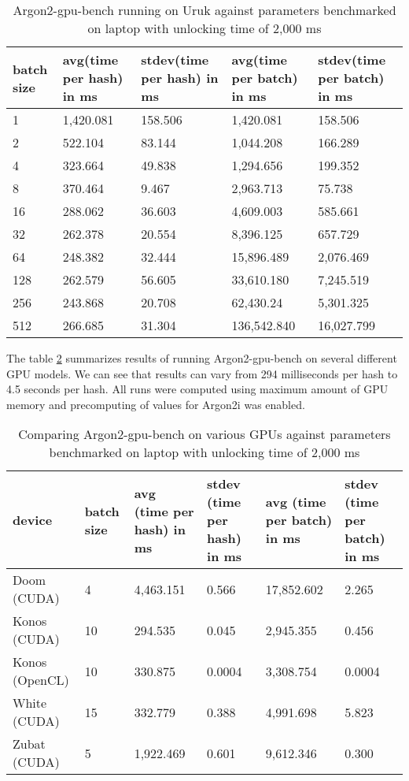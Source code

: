 \documentclass[nolof,digital]{fithesis3}
\begin{document}
\noindent
\begin{table}
\caption{Argon2-gpu-bench running on Uruk against parameters benchmarked on laptop with unlocking time of 2,000 ms}
\label{tab:uruk}
\begin{tabularx}{\textwidth}{| X | X | X | X | X |}
\hline
batch size & avg(time per hash) in ms & stdev(time per hash) in ms & avg(time per batch) in ms & stdev(time per batch) in ms\\
\hline
1 & 1,420.081 & 158.506 & 1,420.081 & 158.506\\
\hline
2 & 522.104 & 83.144 & 1,044.208 & 166.289\\
\hline
4 & 323.664 & 49.838 & 1,294.656 & 199.352\\
\hline
8 & 370.464 & 9.467 & 2,963.713 & 75.738\\
\hline
16 & 288.062 & 36.603 & 4,609.003 & 585.661\\
\hline
32 & 262.378 & 20.554 & 8,396.125 & 657.729\\
\hline
64 & 248.382 & 32.444 & 15,896.489 & 2,076.469\\
\hline
128 & 262.579 & 56.605 & 33,610.180 & 7,245.519\\
\hline
256 & 243.868 & 20.708 & 62,430.24 & 5,301.325\\
\hline
512 & 266.685 & 31.304 & 136,542.840 & 16,027.799\\
\hline
\end{tabularx}
\end{table}

The table \ref{tab:gpus} summarizes results of running Argon2-gpu-bench on several different GPU models. We can see that results can vary from 294 milliseconds per hash to 4.5 seconds per hash. All runs were computed using maximum amount of GPU memory and precomputing of values for Argon2i was enabled.

\noindent
\begin{table}
\caption{Comparing Argon2-gpu-bench on various GPUs against parameters benchmarked on laptop with unlocking time of 2,000 ms}
\label{tab:gpus}
\begin{tabularx}{\textwidth}{| X | X | X | X | X | X |}
\hline
device & batch size & avg (time per hash) in ms & stdev (time per hash) in ms & avg (time per batch) in ms & stdev (time per batch) in ms\\
\hline
Doom (CUDA) & 4 & 4,463.151 & 0.566 & 17,852.602 & 2.265\\
\hline
Konos (CUDA) & 10 & 294.535 & 0.045 & 2,945.355 & 0.456\\
\hline
Konos (OpenCL) & 10 & 330.875 & 0.0004 & 3,308.754 & 0.0004\\
\hline
White  (CUDA) & 15 & 332.779 & 0.388 & 4,991.698 & 5.823\\
\hline
Zubat (CUDA) & 5 & 1,922.469 & 0.601 & 9,612.346 &0.300\\
\hline
\end{tabularx}
\end{table}
\end{document}

